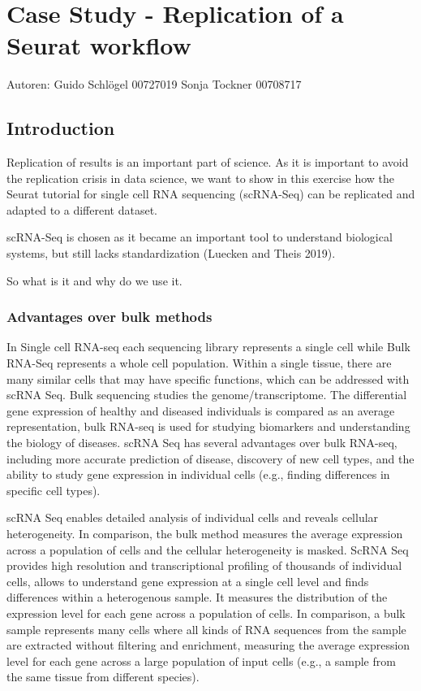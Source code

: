 \hypertarget{case-study---replication-of-a-seurat-workflow}{%
\section{Case Study - Replication of a Seurat
workflow}\label{case-study---replication-of-a-seurat-workflow}}

Autoren: Guido Schlögel 00727019 Sonja Tockner 00708717

\hypertarget{introduction}{%
\subsection{Introduction}\label{introduction}}

Replication of results is an important part of science. As it is
important to avoid the replication crisis in data science, we want to
show in this exercise how the Seurat tutorial for single cell RNA
sequencing (scRNA-Seq) can be replicated and adapted to a different
dataset.

scRNA-Seq is chosen as it became an important tool to understand
biological systems, but still lacks standardization (Luecken and Theis
2019).

So what is it and why do we use it.

\hypertarget{advantages-over-bulk-methods}{%
\subsubsection{Advantages over bulk
methods}\label{advantages-over-bulk-methods}}

In Single cell RNA-seq each sequencing library represents a single cell
while Bulk RNA-Seq represents a whole cell population. Within a single
tissue, there are many similar cells that may have specific functions,
which can be addressed with scRNA Seq. Bulk sequencing studies the
genome/transcriptome. The differential gene expression of healthy and
diseased individuals is compared as an average representation, bulk
RNA-seq is used for studying biomarkers and understanding the biology of
diseases. scRNA Seq has several advantages over bulk RNA-seq, including
more accurate prediction of disease, discovery of new cell types, and
the ability to study gene expression in individual cells (e.g., finding
differences in specific cell types).

scRNA Seq enables detailed analysis of individual cells and reveals
cellular heterogeneity. In comparison, the bulk method measures the
average expression across a population of cells and the cellular
heterogeneity is masked. ScRNA Seq provides high resolution and
transcriptional profiling of thousands of individual cells, allows to
understand gene expression at a single cell level and finds differences
within a heterogenous sample. It measures the distribution of the
expression level for each gene across a population of cells. In
comparison, a bulk sample represents many cells where all kinds of RNA
sequences from the sample are extracted without filtering and
enrichment, measuring the average expression level for each gene across
a large population of input cells (e.g., a sample from the same tissue
from different species).

